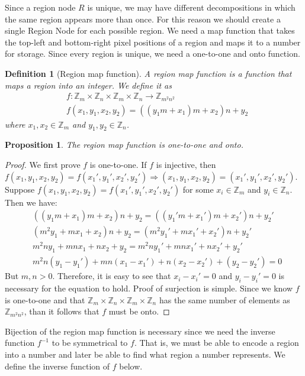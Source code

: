 \documentclass{amsart}
\theoremstyle{plain}
\newcounter{dummy-def}\numberwithin{dummy-def}{section}
\newtheorem{definition}[dummy-def]{Definition}
\newcounter{dummy-thm}\numberwithin{dummy-thm}{section}
\newcounter{dummy-prop}\numberwithin{dummy-prop}{section}
\newtheorem{proposition}[dummy-prop]{Proposition}
\newcounter{dummy-corollary}\numberwithin{dummy-corollary}{section}
\newcounter{dummy-lemma}\numberwithin{dummy-lemma}{section}
\newcounter{dummy-ex}\numberwithin{dummy-ex}{section}
\newcounter{dummy-eg}\numberwithin{dummy-eg}{section}
\numberwithin{equation}{section}
\renewcommand{\implies}{\Rightarrow}
\begin{document}
Since a region node $R$ is unique, we may have different decompositions in which the same region
appears more than once. For this reason we should create a single Region Node for each possible
region. We need a map function that takes the top-left and bottom-right pixel positions of a region
and maps it to a number for storage. Since every region is unique, we need a one-to-one and onto
function.

\begin{definition}[Region map function]
  A region map function is a function that maps a region into an integer. We define it as
  \begin{align*}
    &f:\mathbb{Z}_m\times\mathbb{Z}_n\times\mathbb{Z}_m\times\mathbb{Z}_n\to\mathbb{Z}_{m^2n^2}\\
    &f(x_1, y_1, x_2, y_2) = ((y_1m+x_1)m+x_2)n+y_2
  \end{align*}
  where $x_1,x_2\in\mathbb{Z}_m$ and $y_1,y_2\in\mathbb{Z}_n$.
\end{definition}

\begin{proposition}
  The region map function is one-to-one and onto.
\end{proposition}
\begin{proof}
  We first prove $f$ is one-to-one. If $f$ is injective, then $f(x_1,y_1,x_2,y_2) =
  f(x_1',y_1',x_2',y_2') \implies (x_1,y_1,x_2,y_2)=(x_1',y_1',x_2',y_2')$. Suppose
  $f(x_1,y_1,x_2,y_2)=f(x_1',y_1',x_2',y_2')$ for some $x_i\in\mathbb{Z}_m$ and
  $y_i\in\mathbb{Z}_n$. Then we have:
  \begin{align*}
    &((y_1m+x_1)m+x_2)n+y_2=((y_1'm+x_1')m+x_2')n+y_2'\\
    &(m^2y_1+mx_1+x_2)n+y_2=(m^2y_1'+mx_1'+x_2')n+y_2'\\
    &m^2ny_1+mnx_1+nx_2+y_2=m^2ny_1'+mnx_1'+nx_2'+y_2'\\
    &m^2n(y_1-y_1')+mn(x_1-x_1')+n(x_2-x_2')+(y_2-y_2')=0
  \end{align*}
  But $m,n>0$. Therefore, it is easy to see that $x_i-x_i'=0$ and $y_i-y_i'=0$ is necessary for the
  equation to hold. Proof of surjection is simple. Since we know $f$ is one-to-one and that
  $\mathbb{Z}_m\times\mathbb{Z}_n\times\mathbb{Z}_m\times\mathbb{Z}_n$ has the same number of
  elements as $\mathbb{Z}_{m^2n^2}$, than it follows that $f$ must be onto.
\end{proof}

Bijection of the region map function is necessary since we need the inverse function $f^{-1}$ to be
symmetrical to $f$. That is, we must be able to encode a region into a number and later be able to
find what region a number represents. We define the inverse function of $f$ below.
\end{document}

